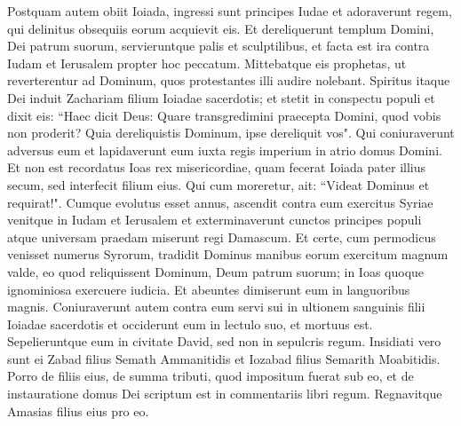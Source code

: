 \begin{biblechapter}
\verse Postquam autem obiit Ioiada, ingressi sunt principes Iudae et adoraverunt regem, qui delinitus obsequiis eorum acquievit eis. 
\verse Et dereliquerunt templum Domini, Dei patrum suorum, servieruntque palis et sculptilibus, et facta est ira contra Iudam et Ierusalem propter hoc peccatum. 
\verse Mittebatque eis prophetas, ut reverterentur ad Dominum, quos protestantes illi audire nolebant. 
\verse Spiritus itaque Dei induit Zachariam filium Ioiadae sacerdotis; et stetit in conspectu populi et dixit eis: “Haec dicit Deus: Quare transgredimini praecepta Domini, quod vobis non proderit? Quia dereliquistis Dominum, ipse dereliquit vos". 
\verse Qui coniuraverunt adversus eum et lapidaverunt eum iuxta regis imperium in atrio domus Domini. 
\verse Et non est recordatus Ioas rex misericordiae, quam fecerat Ioiada pater illius secum, sed interfecit filium eius. Qui cum moreretur, ait: “Videat Dominus et requirat!". 
\verse Cumque evolutus esset annus, ascendit contra eum exercitus Syriae venitque in Iudam et Ierusalem et exterminaverunt cunctos principes populi atque universam praedam miserunt regi Damascum. 
\verse Et certe, cum permodicus venisset numerus Syrorum, tradidit Dominus manibus eorum exercitum magnum valde, eo quod reliquissent Dominum, Deum patrum suorum; in Ioas quoque ignominiosa exercuere iudicia. 
\verse Et abeuntes dimiserunt eum in languoribus magnis. Coniuraverunt autem contra eum servi sui in ultionem sanguinis filii Ioiadae sacerdotis et occiderunt eum in lectulo suo, et mortuus est. Sepelieruntque eum in civitate David, sed non in sepulcris regum. 
\verse Insidiati vero sunt ei Zabad filius Semath Ammanitidis et Iozabad filius Semarith Moabitidis. 
\verse Porro de filiis eius, de summa tributi, quod impositum fuerat sub eo, et de instauratione domus Dei scriptum est in commentariis libri regum. Regnavitque Amasias filius eius pro eo. 
\end{biblechapter}

